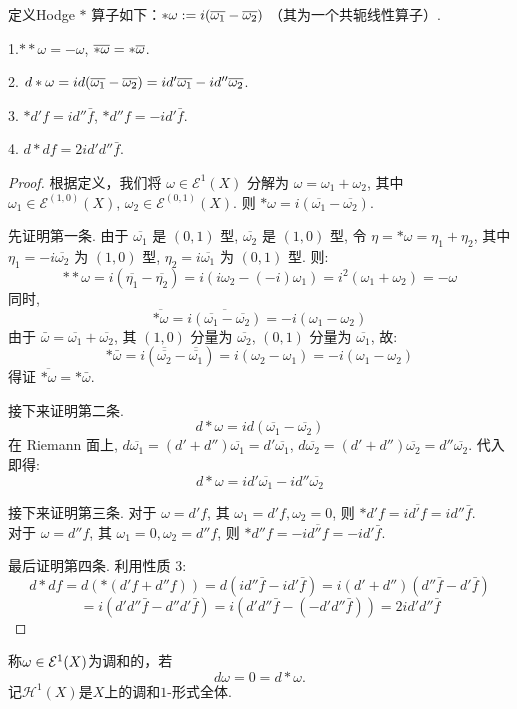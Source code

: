 \begin{definition}
	定义Hodge $*$ 算子如下：$*\omega:=i(\overline{\omega_1}-\overline{\omega_2})$
    （其为一个共轭线性算子）.
\end{definition}

\begin{proposition}

	1.$**\omega=-\omega$, $\overline{*\omega}=*\overline{\omega}$.

	2. $d*\omega=id(\overline{\omega_1}-\overline{\omega_2})
    =id'\overline{\omega_1}-id''\overline{\omega_2}$.

	3. $*d'f=id''\bar{f}$, $*d''f=-id'\bar{f}$.

	4. $d*df=2id'd''\bar{f}$.
\end{proposition}
\begin{proof}
根据定义，我们将 $\omega \in \mathcal{E}^1(X)$ 分解为 $\omega = \omega_1 + \omega_2$, 其中 $\omega_1 \in \mathcal{E}^{(1,0)}(X)$, $\omega_2 \in \mathcal{E}^{(0,1)}(X)$. 则 $*\omega = i(\overline{\omega_1} - \overline{\omega_2})$.

    先证明第一条.
    由于 $\overline{\omega_1}$ 是 $(0,1)$ 型, $\overline{\omega_2}$ 是 $(1,0)$ 型, 令 $\eta = *\omega = \eta_1 + \eta_2$, 其中 $\eta_1 = -i\overline{\omega_2}$ 为 $(1,0)$ 型, $\eta_2 = i\overline{\omega_1}$ 为 $(0,1)$ 型. 则:
    \[ **\omega = i(\overline{\eta_1} - \overline{\eta_2}) = i(i\omega_2 - (-i)\omega_1) = i^2(\omega_1 + \omega_2) = -\omega \]
    同时, 
    \[ \overline{*\omega} = \overline{i(\overline{\omega_1} - \overline{\omega_2})} = -i(\omega_1 - \omega_2) \]
    由于 $\bar{\omega} = \overline{\omega_1} + \overline{\omega_2}$, 其 $(1,0)$ 分量为 $\overline{\omega_2}$, $(0,1)$ 分量为 $\overline{\omega_1}$, 故:
    \[ *\bar{\omega} = i(\overline{\overline{\omega_2}} - \overline{\overline{\omega_1}}) = i(\omega_2 - \omega_1) = -i(\omega_1 - \omega_2) \]
    得证 $\overline{*\omega} = *\bar{\omega}$.

    接下来证明第二条.
    \[ d*\omega = i d(\overline{\omega_1} - \overline{\omega_2}) \]
    在 Riemann 面上, $d\overline{\omega_1} = (d' + d'')\overline{\omega_1} = d'\overline{\omega_1}$, $d\overline{\omega_2} = (d' + d'')\overline{\omega_2} = d''\overline{\omega_2}$. 代入即得:
    \[ d*\omega = id'\overline{\omega_1} - id''\overline{\omega_2} \]

    接下来证明第三条.
    对于 $\omega = d'f$, 其 $\omega_1 = d'f, \omega_2 = 0$, 则 $*d'f = i\overline{d'f} = id''\bar{f}$. \\
    对于 $\omega = d''f$, 其 $\omega_1 = 0, \omega_2 = d''f$, 则 $*d''f = -i\overline{d''f} = -id'\bar{f}$.

    最后证明第四条.
    利用性质 3:
    \[ d * df = d(*(d'f + d''f)) = d(id''\bar{f} - id'\bar{f}) = i(d' + d'')(d''\bar{f} - d'\bar{f}) \]
    \[ = i(d'd''\bar{f} - d''d'\bar{f}) = i(d'd''\bar{f} - (-d'd''\bar{f})) = 2id'd''\bar{f} \]
\end{proof}
\begin{definition}
	称$\omega\in \mathcal{E}^1(X)$为调和的，若
	$$d\omega=0=d*\omega.$$
	记$\mathscr{H}^1(X)$是$X$上的调和$1$-形式全体.
\end{definition}
		
